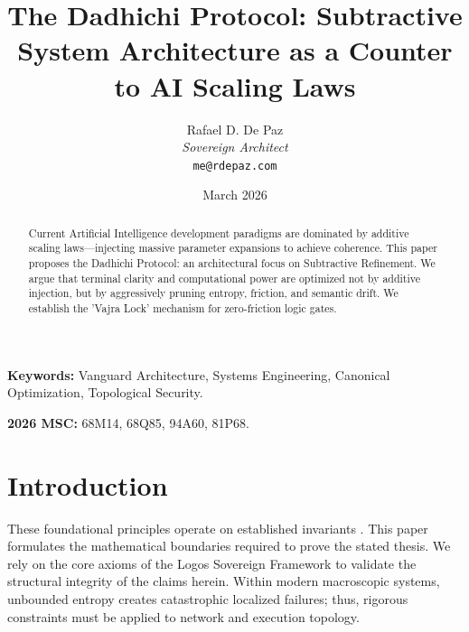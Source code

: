 \documentclass[12pt, a4paper]{article}
\theoremstyle{plain}
\theoremstyle{definition}
\theoremstyle{remark}
\begin{document}
\title{
  \textbf{The Dadhichi Protocol: Subtractive System Architecture as a Counter to AI Scaling Laws}
}
\author{
  Rafael D. De Paz \\
  \textit{Sovereign Architect} \\
  \texttt{me@rdepaz.com}
}
\date{March 2026}
\maketitle

\begin{abstract}
Current Artificial Intelligence development paradigms are dominated by additive scaling laws—injecting massive parameter expansions to achieve coherence. This paper proposes the Dadhichi Protocol: an architectural focus on Subtractive Refinement. We argue that terminal clarity and computational power are optimized not by additive injection, but by aggressively pruning entropy, friction, and semantic drift. We establish the 'Vajra Lock' mechanism for zero-friction logic gates.
\end{abstract}

\vspace{1em}
\noindent\textbf{Keywords:} Vanguard Architecture, Systems Engineering, Canonical Optimization, Topological Security.

\vspace{0.5em}
\noindent\textbf{2026 MSC:} 68M14, 68Q85, 94A60, 81P68.

\section{Introduction}
These foundational principles operate on established invariants \cite{frankle2018lottery,han2015learning}.\label{sec:intro}
This paper formulates the mathematical boundaries required to prove the stated thesis. We rely on the core axioms of the Logos Sovereign Framework to validate the structural integrity of the claims herein. Within modern macroscopic systems, unbounded entropy creates catastrophic localized failures; thus, rigorous constraints must be applied to network and execution topology.

\end{document}
